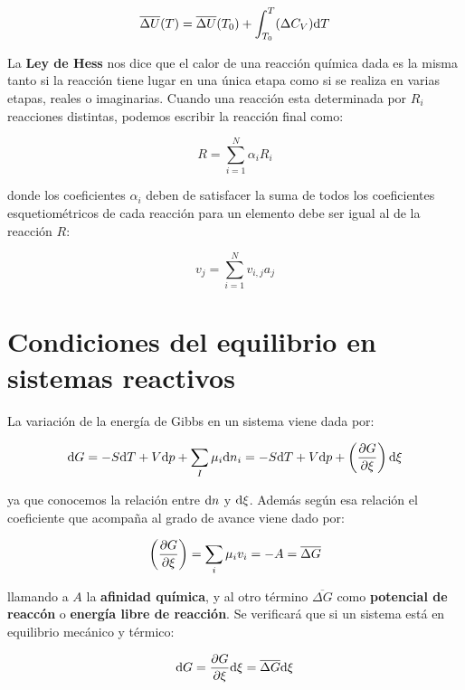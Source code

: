 \documentclass[12pt,a4paper,oneside]{book}
\begin{document}
\begin{equation}
\overline{\Delta U} (T) = \overline{\Delta U} (T_0) + \int_{T_0}^T (\Delta C_V) \mathrm{d} T
\end{equation}

La \textbf{Ley de Hess} nos dice que el calor de una reacción química dada es la misma tanto si la reacción tiene lugar en una única etapa como si se realiza en varias etapas, reales o imaginarias.  Cuando una reacción esta determinada por $R_i$ reacciones distintas, podemos escribir la reacción final como:

\begin{equation}
R = \sum_{i=1}^N \alpha_i R_i
\end{equation}

donde los coeficientes $\alpha_i$ deben de satisfacer la suma de todos los coeficientes esquetiométricos de cada reacción para un elemento debe ser igual al de la reacción $R$:

\begin{equation}
v_j = \sum_{i=1}^N v_{i,j} a_j
\end{equation}

\section{Condiciones del equilibrio en sistemas reactivos}

La variación de la energía de Gibbs en un sistema viene dada por:

\begin{equation}
\mathrm{d} G = - S \mathrm{d} T + V \mathrm{d} p + \sum_I \mu_i \mathrm{d} n_i = -S \mathrm{d} T + V \mathrm{d} p + \left( \dfrac{\partial G}{\partial \xi} \right) \mathrm{d} \xi
\end{equation}

ya que conocemos la relación entre $\mathrm{d} n$ y $\mathrm{d} \xi$. Además según esa relación el coeficiente que acompaña al grado de avance viene dado por:

\begin{equation}
\left( \dfrac{\partial G}{\partial \xi} \right) = \sum_i \mu_i v_i = -A = \overline{\Delta G} \label{ec:4.15}
\end{equation}

llamando a $A$ la \textbf{afinidad química}, y al otro término $\overline{\Delta G}$ como \textbf{potencial de reaccón} o \textbf{energía libre de reacción}. Se verificará que si un sistema está en equilibrio mecánico y térmico:

\begin{equation}
\mathrm{d} G = \frac{\partial G}{\partial \xi} \mathrm{d} \xi = \overline{\Delta G} \mathrm{d} \xi
\end{equation}
\end{document}
